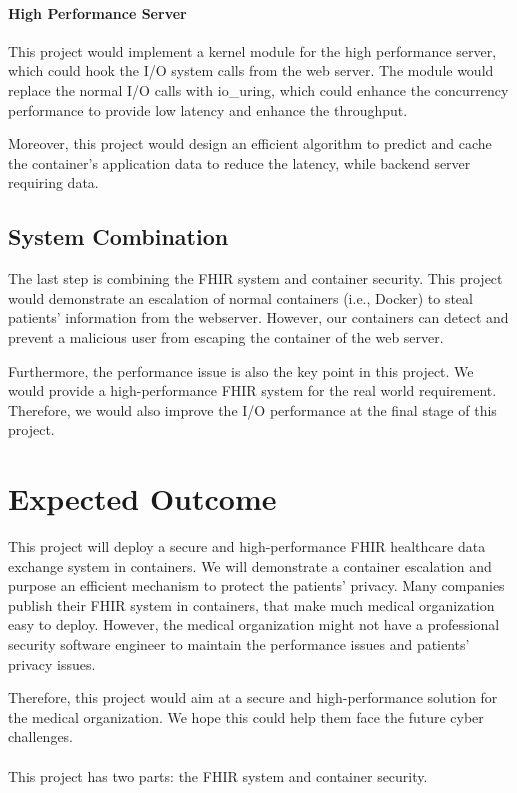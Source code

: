 \documentclass[12pt,a4paper]{article}
\begin{document}
\paragraph{High Performance Server}
This project would implement a kernel module for the high performance server, which could hook
the I/O system calls from the web server. The module would replace the normal I/O calls with
io\_uring, which could enhance the concurrency performance to provide low latency and enhance
the throughput.

Moreover, this project would design an efficient algorithm to predict and cache the container's
application data to reduce the latency, while backend server requiring data.

\subsection{System Combination}
The last step is combining the FHIR system and container security. This project would demonstrate
an escalation of normal containers (i.e., Docker) to steal patients' information from the webserver.
However, our containers can detect and prevent a malicious user from escaping the container of the
web server.

Furthermore, the performance issue is also the key point in this project. We would provide a
high-performance FHIR system for the real world requirement. Therefore, we would also improve the
I/O performance at the final stage of this project.


\section{Expected Outcome}
This project will deploy a secure and high-performance FHIR healthcare data exchange system
in containers. We will demonstrate a container escalation and purpose an efficient mechanism
to protect the patients' privacy. Many companies publish their FHIR system in containers,
that make much medical organization easy to deploy. However, the medical organization might
not have a professional security software engineer to maintain the performance issues and
patients' privacy issues.

Therefore, this project would aim at a secure and high-performance solution for the medical
organization. We hope this could help them face the future cyber challenges.
\paragraph{}
This project has two parts: the FHIR system and container security.
\end{document}
